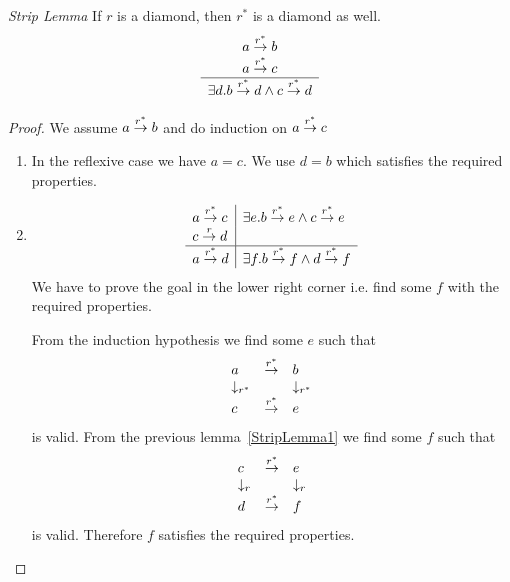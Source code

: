 \begin{lemma}
    \label{StripLemma2}
    \emph{Strip Lemma} If $r$ is a diamond, then $r^*$ is a diamond as well.
    $$
    \begin{array}{c} 
        a \stackrel{r^*}{\to} b
        \\
        a \stackrel{r^*}{\to} c
     \\ \hline 
        \exists d. b \stackrel{r^*}{\to} d \land c \stackrel{r^*}{\to} d
    \end{array}
    $$

    \begin{proof}
        We assume $a \stackrel{r^*}{\to} b$ and do induction on $a \stackrel{r^*}{\to} c$

        \begin{enumerate}
        \item In the reflexive case we have $a = c$. We use $d = b$ which
        satisfies the required properties.

        \item
        $$
        \begin{array}{l|l}
            a \stackrel{r^*}{\to} c
            &
            \exists e. b \stackrel{r^*}{\to} e \land c \stackrel{r^*}{\to} e
            \\
            c \stackrel{r}{\to} d
            \\
            \hline
            a \stackrel{r^*}{\to} d
            &
            \exists f. b \stackrel{r^*}{\to} f \land d \stackrel{r^*}{\to} f
        \end{array}
        $$
        We have to prove the goal in the lower right corner i.e. find some $f$
        with the required properties.

        From the induction hypothesis we find some $e$ such that
        $$
        \begin{array}{lll}
            a &\stackrel{r^*}{\to}& b
            \\
            \downarrow_{r^*} & & \downarrow_{r^*}
            \\
            c &\stackrel{r^*}{\to}& e
        \end{array}
        $$
        is valid. From the previous lemma~\ref{StripLemma1} we find some $f$
        such that
        $$
        \begin{array}{lll}
            c &\stackrel{r^*}{\to}& e
            \\
            \downarrow_{r} & & \downarrow_{r}
            \\
            d &\stackrel{r^*}{\to}& f
        \end{array}
        $$
        is valid. Therefore $f$ satisfies the required properties.
        \end{enumerate}
    \end{proof}
\end{lemma}








